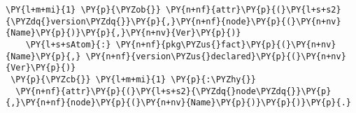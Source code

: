 \begin{Verbatim}[commandchars=\\\{\},fontsize=\footnotesize]
\PY{l+m+mi}{1} \PY{p}{\PYZob{}} \PY{n+nf}{attr}\PY{p}{(}\PY{l+s+s2}{\PYZdq{}version\PYZdq{}}\PY{p}{,}\PY{n+nf}{node}\PY{p}{(}\PY{n+nv}{Name}\PY{p}{)}\PY{p}{,}\PY{n+nv}{Ver}\PY{p}{)}
    \PY{l+s+sAtom}{:} \PY{n+nf}{pkg\PYZus{}fact}\PY{p}{(}\PY{n+nv}{Name}\PY{p}{,} \PY{n+nf}{version\PYZus{}declared}\PY{p}{(}\PY{n+nv}{Ver}\PY{p}{)}
 \PY{p}{\PYZcb{}} \PY{l+m+mi}{1} \PY{p}{:\PYZhy{}}  
  \PY{n+nf}{attr}\PY{p}{(}\PY{l+s+s2}{\PYZdq{}node\PYZdq{}}\PY{p}{,}\PY{n+nf}{node}\PY{p}{(}\PY{n+nv}{Name}\PY{p}{)}\PY{p}{)}\PY{p}{.}
\end{Verbatim}

